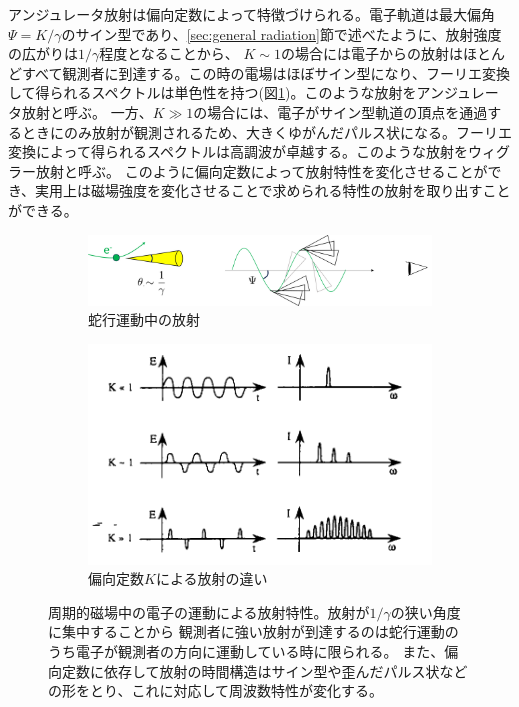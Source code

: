 \documentclass[a4paper,11pt,uplatex]{jsbook}
\begin{document}
アンジュレータ放射は偏向定数によって特徴づけられる。電子軌道は最大偏角$\Psi = K/\gamma$のサイン型であり、\ref{sec:general radiation}節で述べたように、放射強度の広がりは$1/\gamma$程度となることから、
$K \sim 1$の場合には電子からの放射はほとんどすべて観測者に到達する。この時の電場はほぼサイン型になり、フーリエ変換して得られるスペクトルは単色性を持つ(図\ref{Kvalue})。このような放射をアンジュレータ放射と呼ぶ。
一方、$K \gg 1$の場合には、電子がサイン型軌道の頂点を通過するときにのみ放射が観測されるため、大きくゆがんだパルス状になる。フーリエ変換によって得られるスペクトルは高調波が卓越する。このような放射をウィグラー放射と呼ぶ。
このように偏向定数によって放射特性を変化させることができ、実用上は磁場強度を変化させることで求められる特性の放射を取り出すことができる。
\begin{figure}
  \begin{subfigure}[h]{0.5\linewidth}
    \centering
    \includegraphics[width= \linewidth]{image/2-Kvalue.png}
    \caption{蛇行運動中の放射}
  \end{subfigure}
  \begin{subfigure}[h]{0.4\linewidth}
    \centering
    \includegraphics[width= \linewidth]{image/2-KandWave.png}
    \caption{偏向定数$K$による放射の違い\cite{walker}}
  \end{subfigure}
  \centering
  \caption[周期的磁場中の電子の運動による放射特性]{周期的磁場中の電子の運動による放射特性。放射が$1/\gamma$の狭い角度に集中することから
  観測者に強い放射が到達するのは蛇行運動のうち電子が観測者の方向に運動している時に限られる。
  また、偏向定数に依存して放射の時間構造はサイン型や歪んだパルス状などの形をとり、これに対応して周波数特性が変化する。}\label{Kvalue}
\end{figure}
\end{document}
